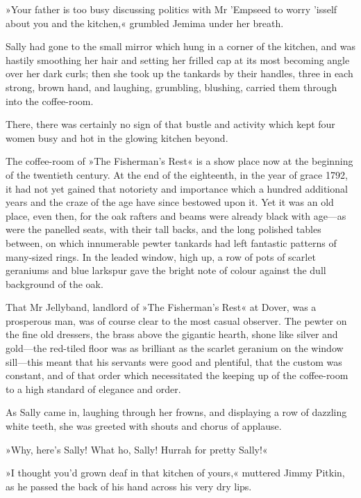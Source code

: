 »Your father is too busy discussing politics with Mr 'Empseed to worry 'isself about you and the kitchen,« grumbled Jemima under her breath.

Sally had gone to the small mirror which hung in a corner of the kitchen, and was hastily smoothing her hair and setting her frilled cap at its most becoming angle over her dark curls; then she took up the tankards by their handles, three in each strong, brown hand, and laughing, grumbling, blushing, carried them through into the coffee-room.

There, there was certainly no sign of that bustle and activity which kept four women busy and hot in the glowing kitchen beyond.

The coffee-room of »The Fisherman's Rest« is a show place now at the beginning of the twentieth century. At the end of the eighteenth, in the year of grace 1792, it had not yet gained that notoriety and importance which a hundred additional years and the craze of the age have since bestowed upon it. Yet it was an old place, even then, for the oak rafters and beams were already black with age\allowbreak---\allowbreak as were the panelled seats, with their tall backs, and the long polished tables between, on which innumerable pewter tankards had left fantastic patterns of many-sized rings. In the leaded window, high up, a row of pots of scarlet geraniums and blue larkspur gave the bright note of colour against the dull background of the oak.

That Mr Jellyband, landlord of »The Fisherman's Rest« at Dover, was a prosperous man, was of course clear to the most casual observer. The pewter on the fine old dressers, the brass above the gigantic hearth, shone like silver and gold\allowbreak---\allowbreak the red-tiled floor was as brilliant as the scarlet geranium on the window sill\allowbreak---\allowbreak this meant that his servants were good and plentiful, that the custom was constant, and of that order which necessitated the keeping up of the coffee-room to a high standard of elegance and order.

As Sally came in, laughing through her frowns, and displaying a row of dazzling white teeth, she was greeted with shouts and chorus of applause.

»Why, here's Sally! What ho, Sally! Hurrah for pretty Sally!«

»I thought you'd grown deaf in that kitchen of yours,« muttered Jimmy Pitkin, as he passed the back of his hand across his very dry lips.

